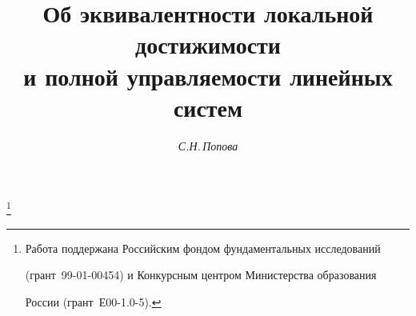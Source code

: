 






\newcommand\eps{\varepsilon}


\newcommand\defeq{:=}


\newcommand\eqdef{=:}


\newcommand{\Ball}{\mathrm B}


\newcommand{\Hom}{\operatorname{Hom}}


\newcommand{\End}{\operatorname{End}}


\newcommand{\oM}{\mathrm M}


\newcommand{\KC}{\mathrm{KC}}


\newcommand{\tts}[1]{} 


\renewcommand{\baselinestretch}{1.05}







\setcounter{page}{50}















\author{\it С.Н.\,Попова}




\title{Об эквивалентности локальной достижимости\\


и полной управляемости линейных систем}


\thanks{Работа поддержана Российским фондом фундаментальных исследований


(грант \No\,99-01-00454) и Конкурсным центром Министерства образования


России (грант \No\,Е00-1.0-5).}





